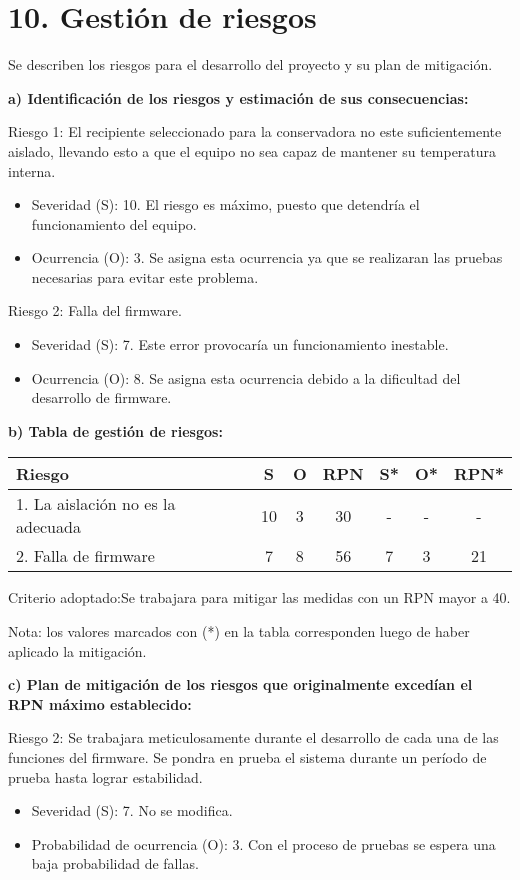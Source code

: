\section{10. Gestión de riesgos}
\label{sec:riesgos}
Se describen los riesgos para el desarrollo del proyecto y su plan de mitigación.

\textbf{a) Identificación de los riesgos y estimación de sus consecuencias:}
 
Riesgo 1: El recipiente seleccionado para la conservadora no este suficientemente aislado, llevando esto a que el equipo no sea capaz de mantener su temperatura interna.
\begin{itemize}
\item Severidad (S): 10. El riesgo es máximo, puesto que detendría el funcionamiento del equipo.
\item Ocurrencia (O): 3. Se asigna esta ocurrencia ya que se realizaran las pruebas necesarias para evitar este problema.
\end{itemize}   

Riesgo 2: Falla del firmware.
\begin{itemize}
\item Severidad (S): 7. Este error provocaría un funcionamiento inestable.
\item Ocurrencia (O): 8. Se asigna esta ocurrencia debido a la dificultad del desarrollo de firmware.
\end{itemize}   


\textbf{b) Tabla de gestión de riesgos:}

\begin{table}[htpb]
\centering
\begin{tabularx}{\linewidth}{@{}|X|c|c|c|c|c|c|@{}}
\hline
\rowcolor[HTML]{C0C0C0} 
Riesgo & S & O & RPN & S* & O* & RPN*  \\ \hline
1. La aislación no es la adecuada & 10 & 3 & \cellcolor[HTML]{00cc00} 30 & - &  -  & - \\ \hline
2. Falla de firmware & 7 & 8 & \cellcolor[HTML]{ff0000}56 & 7 &  3  & \cellcolor[HTML]{00cc00}21 \\ \hline
\end{tabularx}%
\end{table}

Criterio adoptado:Se trabajara para mitigar las medidas con un RPN mayor a 40.

Nota: los valores marcados con (*) en la tabla corresponden luego de haber aplicado la mitigación.

\textbf{c) Plan de mitigación de los riesgos que originalmente excedían el RPN máximo establecido:}

Riesgo 2: Se trabajara meticulosamente durante el desarrollo de cada una de las funciones del firmware. Se pondra en prueba el sistema durante un período de prueba hasta lograr estabilidad.
\begin{itemize}
\item Severidad (S): 7. No se modifica.
\item Probabilidad de ocurrencia (O): 3. Con el proceso de pruebas se espera una baja probabilidad de fallas.
\end{itemize}